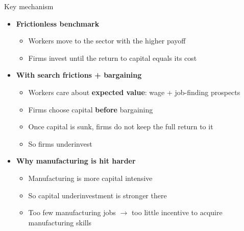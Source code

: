 \documentclass[9pt,xcolor={svgnames}]{beamer}
\begin{document}
\begin{frame}{Key mechanism}

\begin{itemize}
    \item \textbf{Frictionless benchmark}
    \begin{itemize}
        \item Workers move to the sector with the higher payoff
        \item Firms invest until the return to capital equals its cost
    \end{itemize}

    \vspace{3mm}

    \item \textbf{With search frictions + bargaining}
    \begin{itemize}
        \item Workers care about \textbf{expected value}: wage + job-finding prospects
        \item Firms choose capital \textbf{before} bargaining
        \item Once capital is sunk, firms do not keep the full return to it
        \item So firms underinvest
    \end{itemize}

    \vspace{3mm}

    \item \textbf{Why manufacturing is hit harder}
    \begin{itemize}
        \item Manufacturing is more capital intensive
        \item So capital underinvestment is stronger there
        \item Too few manufacturing jobs $\rightarrow$ too little incentive to acquire manufacturing skills
    \end{itemize}
\end{itemize}
\end{frame}



\end{document}
